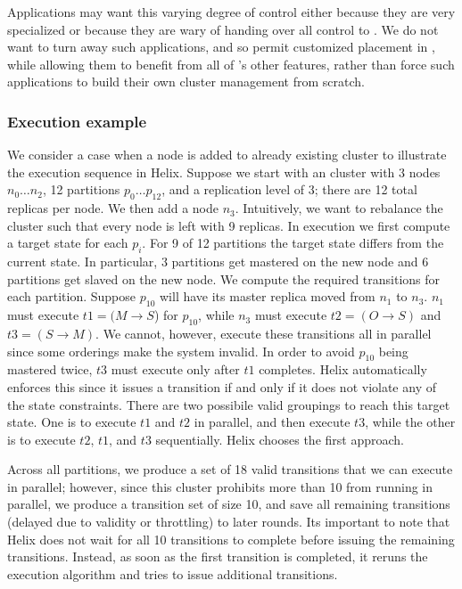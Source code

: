 Applications may want this varying degree of control either because they are very specialized or because they
are wary of handing over all control to \helix.   We do not want to turn away
such applications, and so permit customized placement in \helix, while allowing
them to benefit from all of \helix's other features, rather than 
force such applications to build their own cluster management from scratch.



\subsubsection{Execution example}
%
We consider a case when a node is added to already existing
cluster to illustrate the execution sequence in Helix.
Suppose we start with an \ES cluster with 3 nodes $n_0 \ldots n_2$, 12
partitions $p_0 \ldots p_{12}$, and a replication level of 3; there are 12 total
replicas per node.  We then add a node $n_3$. 
Intuitively, we want to rebalance the cluster such that every node is left with
9 replicas.  In \helix execution we first compute a target state for each
$p_i$.  For 9 of 12 partitions the target state differs from the current state.  In
particular, 3 partitions get mastered on the new node and 6 partitions get
slaved on the new node.  We compute the required transitions for each partition.
Suppose $p_{10}$ will have its master replica moved from $n_1$ to $n_3$.  $n_1$
must execute $t1=(M \rightarrow S$) for $p_{10}$, while $n_3$ must execute $t2=(O
\rightarrow S)$ and $t3=(S \rightarrow M)$.  We cannot, however, execute these
transitions all in parallel since some orderings make the system invalid.
In order to avoid $p_{10}$ being mastered twice, $t3$ must execute only after
$t1$ completes. Helix automatically enforces this since it
issues a transition if and only if it does not violate any of the
state constraints. There are two possibile valid groupings to reach this target
state. One is to execute $t1$ and $t2$ in
parallel, and then execute $t3$, while the other is to execute $t2$, $t1$, and $t3$
sequentially. Helix chooses
the first approach.
 
Across all partitions, we produce
a set of 18 valid transitions that we can execute in parallel; however, since 
this \ES cluster prohibits more than 10 from running in parallel, 
we produce a transition set of size 10, and save all remaining transitions
(delayed due to validity or throttling) to later rounds. Its important to note that
Helix does not wait for all 10 transitions to complete before issuing the
remaining transitions. Instead, as soon as the first transition is completed, it
reruns the execution algorithm and tries to issue additional transitions. 

